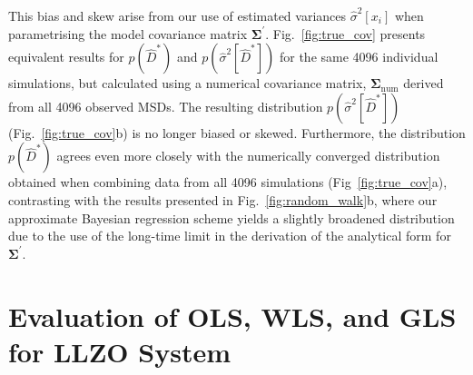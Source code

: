 \documentclass[reprint,superscriptaddress,nobibnotes,amsmath,amssymb,aps,prx,hidelinks,linenumbers]{revtex4-2}
\newcommand{\oMSDi}{\ensuremath{x_i}}
\newcommand{\prob}[1]{\ensuremath{p(#1)}}
\newcommand{\Dest}{\ensuremath{\widehat{D}^*}}
\newcommand{\var}[1]{\ensuremath{\sigma^2[#1]}}
\newcommand{\varest}[1]{\ensuremath{\widehat{\sigma}^2[#1]}}
\begin{document}
This bias and skew arise from our use of estimated variances $\varest{\oMSDi}$ when parametrising the model covariance matrix $\bm{\Sigma^\prime}$.
Fig.~\ref{fig:true_cov} presents equivalent results for $\prob{\Dest}$ and $\prob{\varest{\Dest}}$ for the same \num{4096} individual simulations, but calculated using a numerical covariance matrix, $\bm{\Sigma}_\mathrm{num}$ derived from all \num{4096} observed MSDs.
The resulting distribution $\prob{\varest{\Dest}}$ (Fig.~\ref{fig:true_cov}b) is no longer biased or skewed.
Furthermore, the distribution $\prob{\Dest}$ agrees even more closely with the numerically converged distribution obtained when combining data from all \num{4096} simulations (Fig~\ref{fig:true_cov}a), contrasting with the results presented in Fig.~\ref{fig:random_walk}b, where our approximate Bayesian regression scheme yields a slightly broadened distribution due to the use of the long-time limit in the derivation of the analytical form for $\bm{\Sigma^\prime}$.

\section{Evaluation of OLS, WLS, and GLS for LLZO System}
\end{document}
